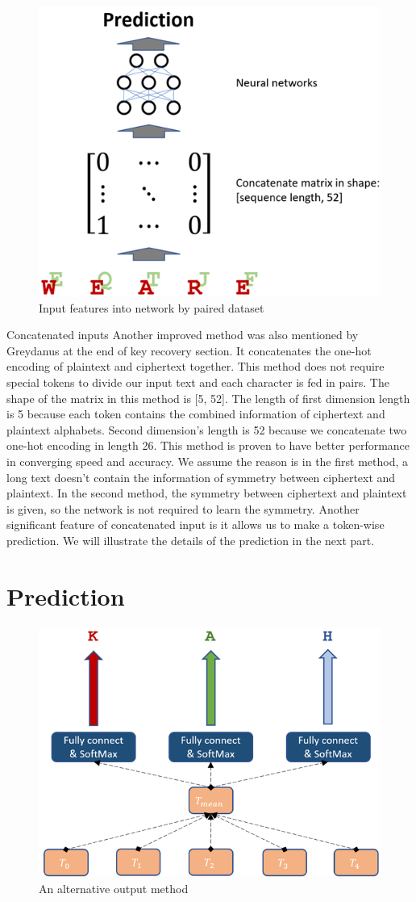 \begin{figure}[hbt!]
    \centering
    \includegraphics[width=0.5\linewidth]{myReport//figures/input_pair.png}
    \caption{Input features into network by paired dataset}
    \label{fig:enter-label}
\end{figure}

Concatenated inputs	Another improved method was also mentioned by Greydanus \cite{greydanus2017learning} at the end of key recovery section. It concatenates the one-hot encoding of plaintext and ciphertext together. This method does not require special tokens to divide our input text and each character is fed in pairs. The shape of the matrix in this method is [5, 52]. The length of first dimension length is 5 because each token contains the combined information of ciphertext and plaintext alphabets. Second dimension’s length is 52 because we concatenate two one-hot encoding in length 26. This method is proven to have better performance in converging speed and accuracy. We assume the reason is in the first method, a long text doesn’t contain the information of symmetry between ciphertext and plaintext. In the second method, the symmetry between ciphertext and plaintext is given, so the network is not required to learn the symmetry. Another significant feature of concatenated input is it allows us to make a token-wise prediction. We will illustrate the details of the prediction in the next part.


\section{Prediction}

\begin{figure}[hbt!]
    \centering
    \includegraphics[width=0.5\linewidth]{myReport//figures/output_proj.png}
    \caption{An alternative output method}
    \label{fig:enter-label}
\end{figure}

